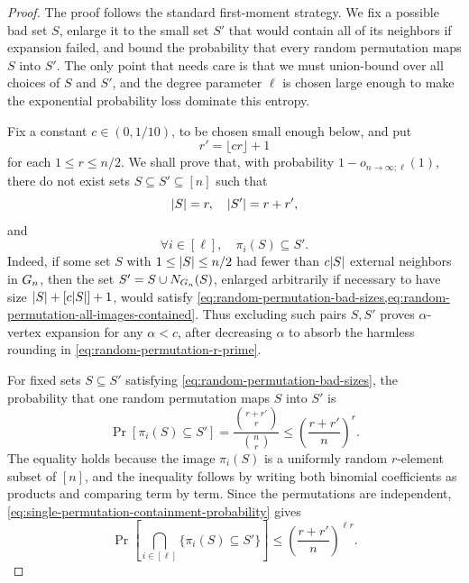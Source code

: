 \begin{proof}
	The proof follows the standard first-moment strategy. We fix a possible bad set \(S\), enlarge it to the small set \(S'\) that would contain all of its neighbors if expansion failed, and bound the probability that every random permutation maps \(S\) into \(S'\). The only point that needs care is that we must union-bound over all choices of \(S\) and \(S'\), and the degree parameter \(\ell\) is chosen large enough to make the exponential probability loss dominate this entropy.

	Fix a constant \(c\in(0,1/10)\), to be chosen small enough below, and put
	\begin{equation}
		\label{eq:random-permutation-r-prime}
		r'=\lfloor cr\rfloor+1
	\end{equation}
	for each \(1\leq r\leq n/2\). We shall prove that, with probability \(1-o_{n\to\infty;\ell}(1)\), there do not exist sets \(S\subseteq S'\subseteq[n]\) such that
	\begin{equation}
		\label{eq:random-permutation-bad-sizes}
		\lvert S\rvert=r,\quad \lvert S'\rvert=r+r',
	\end{equation}
	and
	\begin{equation}
		\label{eq:random-permutation-all-images-contained}
		\forall i\in[\ell],\quad \pi_i(S)\subseteq S'.
	\end{equation}
	Indeed, if some set \(S\) with \(1\leq\lvert S\rvert\leq n/2\) had fewer than \(c\lvert S\rvert\) external neighbors in \(G_n\), then the set \(S'=S\cup N_{G_n}(S)\), enlarged arbitrarily if necessary to have size \(\lvert S\rvert+[ c\lvert S\rvert]+1\), would satisfy \cref{eq:random-permutation-bad-sizes,eq:random-permutation-all-images-contained}. Thus excluding such pairs \(S,S'\) proves \(\alpha\)-vertex expansion for any \(\alpha<c\), after decreasing \(\alpha\) to absorb the harmless rounding in \cref{eq:random-permutation-r-prime}.

	For fixed sets \(S\subseteq S'\) satisfying \cref{eq:random-permutation-bad-sizes}, the probability that one random permutation maps \(S\) into \(S'\) is
	\begin{equation}
		\label{eq:single-permutation-containment-probability}
		\Pr[\pi_i(S)\subseteq S']
		=
		\frac{\binom{r+r'}{r}}{\binom{n}{r}}
		\leq
		\left(\frac{r+r'}{n}\right)^r.
	\end{equation}
	The equality holds because the image \(\pi_i(S)\) is a uniformly random \(r\)-element subset of \([n]\), and the inequality follows by writing both binomial coefficients as products and comparing term by term. Since the permutations are independent, \cref{eq:single-permutation-containment-probability} gives
	\begin{equation}
		\label{eq:all-permutations-containment-probability}
		\Pr\left[\bigcap_{i\in[\ell]}\{\pi_i(S)\subseteq S'\}\right]
		\leq
		\left(\frac{r+r'}{n}\right)^{\ell r}.
	\end{equation}


\end{proof}
